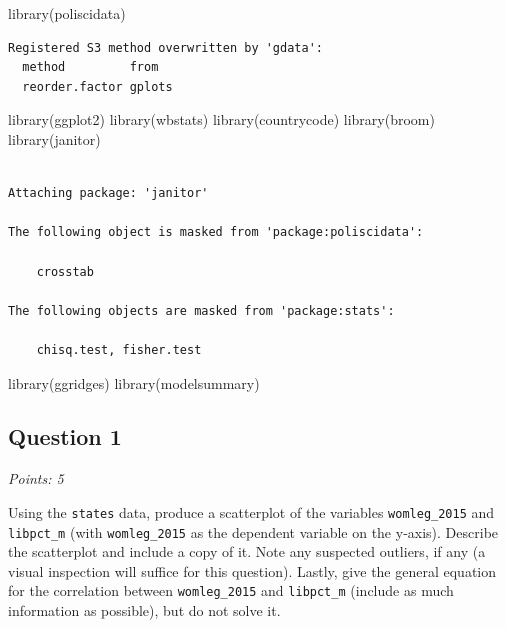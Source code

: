 \documentclass[
  letterpaper,
  DIV=11,
  numbers=noendperiod]{scrartcl}
\newenvironment{Shaded}{\begin{snugshade}}{\end{snugshade}}
\newcommand{\FunctionTok}[1]{\textcolor[rgb]{0.28,0.35,0.67}{#1}}
\newcommand{\NormalTok}[1]{\textcolor[rgb]{0.00,0.23,0.31}{#1}}
\begin{document}
\begin{Shaded}
\begin{Highlighting}[]
\FunctionTok{library}\NormalTok{(poliscidata)}
\end{Highlighting}
\end{Shaded}

\begin{verbatim}
Registered S3 method overwritten by 'gdata':
  method         from  
  reorder.factor gplots
\end{verbatim}

\begin{Shaded}
\begin{Highlighting}[]
\FunctionTok{library}\NormalTok{(ggplot2)}
\FunctionTok{library}\NormalTok{(wbstats)}
\FunctionTok{library}\NormalTok{(countrycode)}
\FunctionTok{library}\NormalTok{(broom)}
\FunctionTok{library}\NormalTok{(janitor)}
\end{Highlighting}
\end{Shaded}

\begin{verbatim}

Attaching package: 'janitor'

The following object is masked from 'package:poliscidata':

    crosstab

The following objects are masked from 'package:stats':

    chisq.test, fisher.test
\end{verbatim}

\begin{Shaded}
\begin{Highlighting}[]
\FunctionTok{library}\NormalTok{(ggridges)}
\FunctionTok{library}\NormalTok{(modelsummary)}
\end{Highlighting}
\end{Shaded}

\hypertarget{question-1}{%
\subsection{Question 1}\label{question-1}}

\emph{Points: 5}

Using the \texttt{states} data, produce a scatterplot of the variables
\texttt{womleg\_2015} and \texttt{libpct\_m} (with \texttt{womleg\_2015}
as the dependent variable on the y-axis). Describe the scatterplot and
include a copy of it. Note any suspected outliers, if any (a visual
inspection will suffice for this question). Lastly, give the general
equation for the correlation between \texttt{womleg\_2015} and
\texttt{libpct\_m} (include as much information as possible), but do not
solve it.
\end{document}
